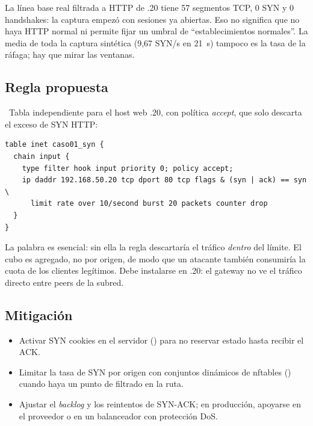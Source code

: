 
La línea base real filtrada a HTTP de .20 tiene 57 segmentos TCP, 0 SYN y 0 handshakes: la captura empezó con sesiones ya abiertas. Eso no significa que no haya HTTP normal ni permite fijar un umbral de ``establecimientos normales''. La media de toda la captura sintética (9,67 SYN/s en 21~s) tampoco es la tasa de la ráfaga; hay que mirar las ventanas.

\subsection{Regla propuesta}
\PROP\ Tabla independiente para el host web .20, con política \emph{accept}, que solo descarta el exceso de SYN HTTP:
\begin{lstlisting}
table inet caso01_syn {
  chain input {
    type filter hook input priority 0; policy accept;
    ip daddr 192.168.50.20 tcp dport 80 tcp flags & (syn | ack) == syn \
      limit rate over 10/second burst 20 packets counter drop
  }
}
\end{lstlisting}
La palabra  es esencial: sin ella la regla descartaría el tráfico \emph{dentro} del límite. El cubo es agregado, no por origen, de modo que un atacante también consumiría la cuota de los clientes legítimos. Debe instalarse en .20: el gateway no ve el tráfico directo entre peers de la subred.

\subsection{Mitigación}
\begin{itemize}
\item Activar SYN cookies en el servidor () para no reservar estado hasta recibir el ACK.
\item Limitar la tasa de SYN por origen con conjuntos dinámicos de nftables (\cod{meter}) cuando haya un punto de filtrado en la ruta.
\item Ajustar el \emph{backlog} y los reintentos de SYN-ACK; en producción, apoyarse en el proveedor o en un balanceador con protección DoS.
\end{itemize}

